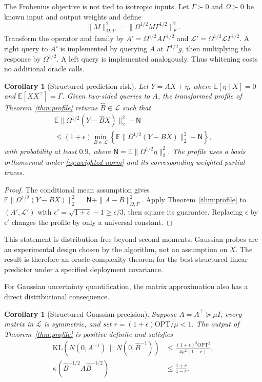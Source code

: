 \documentclass[twoside]{article}
\newtheorem{corollary}[theorem]{Corollary}
\newcommand{\E}{\mathbb E}
\newcommand{\cL}{\mathcal L}
\newcommand{\OPT}{\mathrm{OPT}}
\begin{document}
The Frobenius objective is not tied to isotropic inputs. Let $\Gamma\succ0$ and $\Omega\succ0$ be known input and output weights and define
\begin{equation}
 \|M\|_{\Omega,\Gamma}^2
 =\|\Omega^{1/2}M\Gamma^{1/2}\|_F^2.
 \label{eq:weighted-norm}
\end{equation}
Transform the operator and family by $A'=\Omega^{1/2}A\Gamma^{1/2}$ and $\cL'=\Omega^{1/2}\cL\Gamma^{1/2}$. A right query to $A'$ is implemented by querying $A$ at $\Gamma^{1/2}g$, then multiplying the response by $\Omega^{1/2}$. A left query is implemented analogously. Thus whitening costs no additional oracle calls.

\begin{corollary}[Structured prediction risk]
\label{cor:prediction}
Let $Y=AX+\eta$, where $\E[\eta\mid X]=0$ and $\E[XX^\top]=\Gamma$. Given two-sided queries to $A$, the transformed profile of Theorem~\ref{thm:profile} returns $\widehat B\in\cL$ such that
\begin{multline}
 \E\|\Omega^{1/2}(Y-\widehat BX)\|_2^2-\mathsf N\\
 \le(1+\epsilon)\min_{B\in\cL}
 \left\{\E\|\Omega^{1/2}(Y-BX)\|_2^2-\mathsf N\right\},
 \label{eq:prediction-risk}
\end{multline}
with probability at least $0.9$, where $\mathsf N=\E\|\Omega^{1/2}\eta\|_2^2$. The profile uses a basis orthonormal under \eqref{eq:weighted-norm} and its corresponding weighted partial traces.
\end{corollary}

\begin{proof}
The conditional mean assumption gives $\E\|\Omega^{1/2}(Y-BX)\|_2^2 =\mathsf N+\|A-B\|_{\Omega,\Gamma}^2$. Apply Theorem~\ref{thm:profile} to $(A',\cL')$ with $\epsilon'=\sqrt{1+\epsilon}-1\ge\epsilon/3$, then square its guarantee. Replacing $\epsilon$ by $\epsilon'$ changes the profile by only a universal constant.
\end{proof}

This statement is distribution-free beyond second moments. Gaussian probes are an experimental design chosen by the algorithm, not an assumption on $X$. The result is therefore an oracle-complexity theorem for the best structured linear predictor under a specified deployment covariance.

For Gaussian uncertainty quantification, the matrix approximation also has a direct distributional consequence.

\begin{corollary}[Structured Gaussian precision]
\label{cor:precision}
Suppose $A=A^\top\succeq\mu I$, every matrix in $\cL$ is symmetric, and set $r=(1+\epsilon)\OPT/\mu<1$. The output of Theorem~\ref{thm:profile} is positive definite and satisfies
\begin{align}
 \mathrm{KL}\!\left(N(0,A^{-1})\,\|\,N(0,\widehat B^{-1})\right)
 &\le \frac{(1+\epsilon)^2\OPT^2}{4\mu^2(1-r)},
 \label{eq:kl-bound}\\
 \kappa(\widehat B^{-1/2}A\widehat B^{-1/2})
 &\le\frac{1+r}{1-r}.
 \label{eq:precondition-bound}
\end{align}
\end{corollary}
\end{document}
